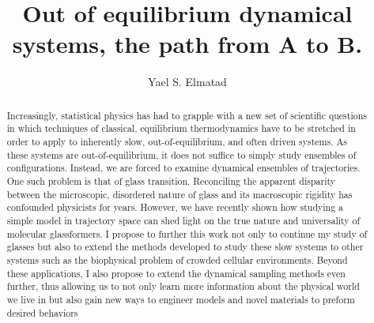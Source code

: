 \documentclass[11pt]{article}
\title{{Out of equilibrium dynamical systems, the path from A to B.}}
\author{Yael S. Elmatad}
\date{}                                           %
\begin{document}
\maketitle
%
\begin{abstract}
Increasingly, statistical physics has had to grapple with a new set of scientific questions in which techniques of classical, equilibrium thermodynamics have to be stretched in order to apply to inherently slow, out-of-equilibrium, and often driven systems.   As these systems are out-of-equilibrium, it does not suffice to simply study ensembles of configurations. Instead, we are forced to examine dynamical ensembles of trajectories.  One such problem is that of glass transition.  Reconciling the apparent disparity between the microscopic, disordered nature of glass and its macroscopic rigidity has confounded physicists for years. However, we have recently shown how studying a simple model in trajectory space can shed light on the true nature and universality of molecular glassformers. I propose to further this work not only to continue my study of glasses but also to extend the methods developed to study these slow systems to other systems such as the biophysical problem of crowded cellular environments.  Beyond these applications, I also propose to extend the dynamical sampling methods even further, thus allowing us to not only learn more information about the physical world we live in but also gain new ways to engineer models and novel materials to preform desired behaviors



\end{abstract}
\end{document}

